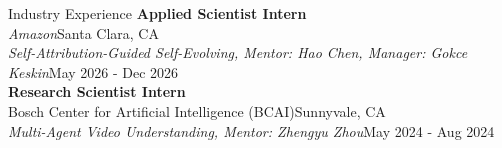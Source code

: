 \documentclass[a4paper, 12pt]{resume} %
\begin{document}
\begin{rSection}{Industry Experience}
{\bf Applied Scientist Intern} \\
{\em Amazon}\hfill{Santa Clara, CA}\\
{\em Self-Attribution-Guided Self-Evolving, Mentor: Hao Chen, Manager: Gokce Keskin}\hfill{May 2026 - Dec 2026} \\
{\bf Research Scientist Intern} \\
{Bosch Center for Artificial Intelligence (BCAI)}\hfill{Sunnyvale, CA}\\
{\em Multi-Agent Video Understanding, Mentor: Zhengyu Zhou}\hfill{May 2024 - Aug 2024}
\end{rSection}

\end{document}
